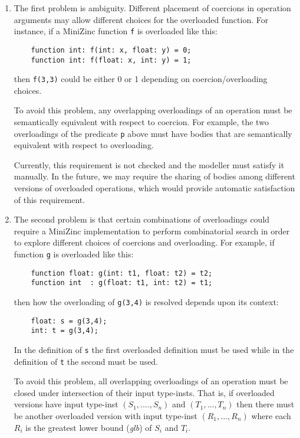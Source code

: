 \documentclass[10pt]{scrartcl}
\begin{document}
\begin{enumerate}
\item
The first problem is ambiguity.  Different placement of coercions in
operation arguments may allow different choices for the overloaded function.
For instance, if a MiniZinc function \texttt{f} is overloaded like this:
\begin{verbatim}
    function int: f(int: x, float: y) = 0;
    function int: f(float: x, int: y) = 1;
\end{verbatim}
then \texttt{f(3,3)} could be either 0 or 1 depending on
coercion/overloading choices.

To avoid this problem, any overlapping overloadings of an operation must
be semantically equivalent with respect to coercion.  For example, the
two overloadings of the predicate \texttt{p} above must have bodies that are
semantically equivalent with respect to overloading.

Currently, this requirement is not checked and the modeller must satisfy it
manually.  In the future, we may require the sharing of bodies among
different versions of overloaded operations, which would provide automatic
satisfaction of this requirement.


\item
The second problem is that certain combinations of overloadings could
require a MiniZinc implementation to perform combinatorial search in
order to explore different choices of coercions and overloading.  For
example, if function \texttt{g} is overloaded like this:
\begin{verbatim}
    function float: g(int: t1, float: t2) = t2;
    function int  : g(float: t1, int: t2) = t1;
\end{verbatim}
then how the overloading of \texttt{g(3,4)} is resolved depends upon its
context:
\begin{verbatim}
    float: s = g(3,4);
    int: t = g(3,4);
\end{verbatim}
In the definition of \texttt{s} the first overloaded definition must be used
while in the definition of \texttt{t} the second must be used.

To avoid this problem, all overlapping overloadings of an operation must be
closed under intersection of their input type-insts.  That is, if overloaded
versions have input type-inst $(S_1,....,S_n)$ and $(T_1,...,T_n)$ then
there must be another overloaded version with input type-inst
$(R_1,...,R_n)$ where each $R_i$ is the greatest lower bound (\emph{glb}) of
$S_i$ and $T_i$.


\end{enumerate}
\end{document}
